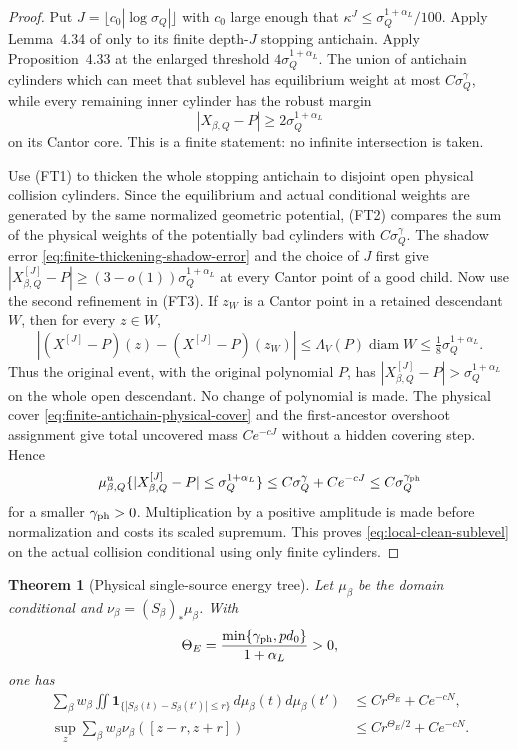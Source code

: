\documentclass[11pt]{article}
\newtheorem{theorem}{Theorem}[section]
\begin{document}
\begin{proof}
Put $J=\lfloor c_0|\log\sigma_Q|\rfloor$ with $c_0$ large enough that
$\kappa^J\le\sigma_Q^{1+\alpha_L}/100$.  Apply Lemma~4.34 of
\cite{Leclerc2026} only to its finite depth-$J$ stopping antichain.  Apply
Proposition~4.33 at the enlarged threshold
$4\sigma_Q^{1+\alpha_L}$.  The union of antichain cylinders which can meet
that sublevel has equilibrium weight at most $C\sigma_Q^{\gamma}$, while
every remaining inner cylinder has the robust margin
\begin{equation}
\label{eq:robust-finite-child-margin}
 |X_{\beta,Q}-P|\ge2\sigma_Q^{1+\alpha_L}
\end{equation}
on its Cantor core.  This is a finite statement: no infinite intersection is
taken.

Use \textup{(FT1)} to thicken the whole stopping antichain to disjoint open
physical collision cylinders.  Since the equilibrium and actual conditional
weights are generated by the same normalized geometric potential,
\textup{(FT2)} compares the sum of the physical weights of the potentially
bad cylinders with $C\sigma_Q^\gamma$.  The shadow error
\eqref{eq:finite-thickening-shadow-error} and the choice of $J$ first give
$|X^{[J]}_{\beta,Q}-P|\ge(3-o(1))\sigma_Q^{1+\alpha_L}$ at every Cantor point
of a good child.  Now use the second refinement in \textup{(FT3)}.  If
$z_W$ is a Cantor point in a retained descendant $W$, then for every $z\in W$,
\[
 |(X^{[J]}-P)(z)-(X^{[J]}-P)(z_W)|
 \le\Lambda_V(P)\operatorname{diam}W
 \le\tfrac18\sigma_Q^{1+\alpha_L}.
\]
Thus the original event, with the original polynomial $P$, has
$|X^{[J]}_{\beta,Q}-P|>\sigma_Q^{1+\alpha_L}$ on the whole open descendant.
No change of polynomial is made.  The physical cover
\eqref{eq:finite-antichain-physical-cover} and the first-ancestor overshoot
assignment give total uncovered mass $Ce^{-cJ}$ without a hidden covering
step.  Hence
\[
 \mu^u_{\beta,Q}
 \{|X^{[J]}_{\beta,Q}-P|\le\sigma_Q^{1+\alpha_L}\}
 \le C\sigma_Q^\gamma+Ce^{-cJ}
 \le C\sigma_Q^{\gamma_{\rm ph}}
\]
for a smaller $\gamma_{\rm ph}>0$.  Multiplication by a positive amplitude is
made before normalization and costs its scaled supremum.  This proves
\eqref{eq:local-clean-sublevel} on the actual collision conditional using
only finite cylinders.
\end{proof}

\begin{theorem}[Physical single-source energy tree]
\label{thm:direct-slope-small-ball}
Let $\mu_\beta$ be the domain conditional and
$\nu_\beta=(S_\beta)_*\mu_\beta$.  With
\begin{equation}
\label{eq:physical-energy-exponent}
 \Theta_E=\frac{\min\{\gamma_{\rm ph},pd_0\}}{1+\alpha_L}>0,
\end{equation}
one has
\begin{align}
 \sum_\beta w_\beta\iint
   \mathbf 1_{\{|S_\beta(t)-S_\beta(t')|\le r\}}
   \,d\mu_\beta(t)d\mu_\beta(t')
 &\le Cr^{\Theta_E}+Ce^{-cN},\label{eq:conditional-energy-bound}\\
 \sup_z\sum_\beta w_\beta\nu_\beta([z-r,z+r])
 &\le Cr^{\Theta_E/2}+Ce^{-cN}.
 \label{eq:slope-value-small-ball}
\end{align}
\end{theorem}
\end{document}
